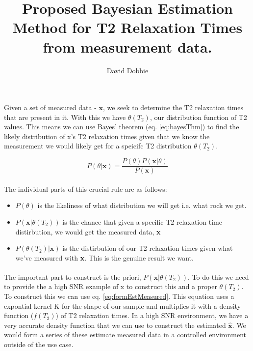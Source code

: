 \documentclass[]{article}
\title{Proposed Bayesian Estimation Method for T2 Relaxation Times from measurement data.}
\author{David Dobbie}
\begin{document}
\maketitle


\section*{}
\paragraph{}
Given a set of measured data - $\textbf{x}$, we seek to determine the T2 relaxation times that are present in it. With this we have $\theta(T_2)$, our distribution function of T2 values. This means we can use Bayes' theorem (eq. \ref{eq:bayesThm}) to find the likely distribution of x's T2 relaxation times given that we know the measurement we would likely get for a speicifc T2 distribution $\theta(T_2)$.

\begin{equation}
P(\theta|\textbf{x}) = \frac{P(\theta)P(\textbf{x}|\theta)}{P(\textbf{x})}
\label{eq:bayesThm}
\end{equation}

\paragraph{}
The individual parts of this crucial rule are as follows:
\begin{itemize}
	\item $ P(\theta) $ is the likeliness of what distribution we will get i.e. what rock we get.
	\item $ P(\textbf{x}|\theta(T_2))$ is the chance that given a specific T2 relaxation time distirbution, we would get the measured data, \textbf{x}
	\item $ P(\theta(T_2) | \textbf{x}) $ is the distirbution of our T2 relaxation times given what we've measured with \textbf{x}. This is the genuine result we want.
\end{itemize}

\paragraph{}
	The important part to construct is the priori, $ P(\textbf{x}|\theta(T_2)) $. To do this we need to provide the a high SNR example of x to construct this and a proper $ \theta(T_2) $. To construct this we can use eq. \ref{eq:formEstMeasured}. This equation uses a expontial kernel K for the shape of our sample and multiplies it with a density function ($ f(T_2) $) of T2 relaxation times. In a high SNR environment, we have a very accurate density function that we can use to construct the estimated $ \hat{\textbf{x}} $. We would form a series of these estimate measured data in a controlled environment outside of the use case.
\end{document}
